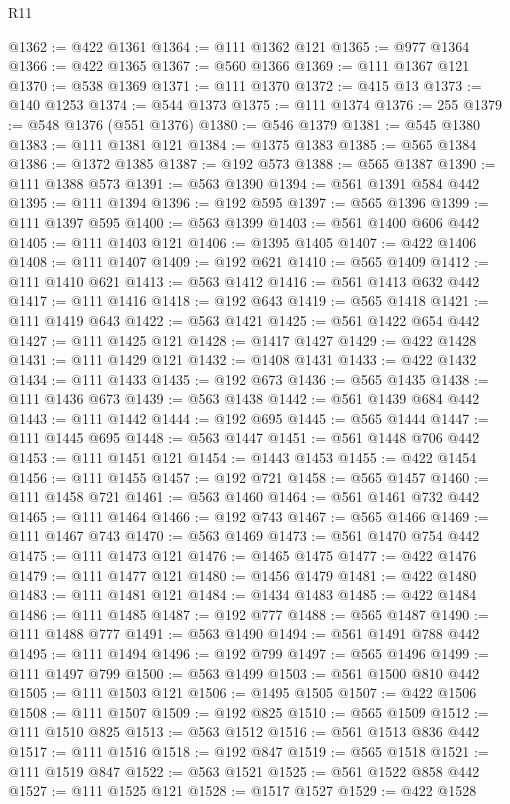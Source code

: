 \begin{lexlean}{R11}
\begin{coremodule}
{{{{{{{{{{{{{{{{{{{{{{{{{{{{{{{{{{{{{{{{{{{{{{{{{{{{{{{{{{{{{{{{{{{{{{{{{{{{{{{{{{@1362 := @422 @1361
@1364 := @111 @1362 @121
@1365 := @977 @1364
@1366 := @422 @1365
@1367 := @560 @1366
@1369 := @111 @1367 @121
@1370 := @538 @1369
@1371 := @111 @1370
@1372 := @415 @13
@1373 := @140 @1253
@1374 := @544 @1373
@1375 := @111 @1374
@1376 := 255
@1379 := @548 @1376 (@551 @1376)
@1380 := @546 @1379
@1381 := @545 @1380
@1383 := @111 @1381 @121
@1384 := @1375 @1383
@1385 := @565 @1384
@1386 := @1372 @1385
@1387 := @192 @573
@1388 := @565 @1387
@1390 := @111 @1388 @573
@1391 := @563 @1390
@1394 := @561 @1391 @584 @442
@1395 := @111 @1394
@1396 := @192 @595
@1397 := @565 @1396
@1399 := @111 @1397 @595
@1400 := @563 @1399
@1403 := @561 @1400 @606 @442
@1405 := @111 @1403 @121
@1406 := @1395 @1405
@1407 := @422 @1406
@1408 := @111 @1407
@1409 := @192 @621
@1410 := @565 @1409
@1412 := @111 @1410 @621
@1413 := @563 @1412
@1416 := @561 @1413 @632 @442
@1417 := @111 @1416
@1418 := @192 @643
@1419 := @565 @1418
@1421 := @111 @1419 @643
@1422 := @563 @1421
@1425 := @561 @1422 @654 @442
@1427 := @111 @1425 @121
@1428 := @1417 @1427
@1429 := @422 @1428
@1431 := @111 @1429 @121
@1432 := @1408 @1431
@1433 := @422 @1432
@1434 := @111 @1433
@1435 := @192 @673
@1436 := @565 @1435
@1438 := @111 @1436 @673
@1439 := @563 @1438
@1442 := @561 @1439 @684 @442
@1443 := @111 @1442
@1444 := @192 @695
@1445 := @565 @1444
@1447 := @111 @1445 @695
@1448 := @563 @1447
@1451 := @561 @1448 @706 @442
@1453 := @111 @1451 @121
@1454 := @1443 @1453
@1455 := @422 @1454
@1456 := @111 @1455
@1457 := @192 @721
@1458 := @565 @1457
@1460 := @111 @1458 @721
@1461 := @563 @1460
@1464 := @561 @1461 @732 @442
@1465 := @111 @1464
@1466 := @192 @743
@1467 := @565 @1466
@1469 := @111 @1467 @743
@1470 := @563 @1469
@1473 := @561 @1470 @754 @442
@1475 := @111 @1473 @121
@1476 := @1465 @1475
@1477 := @422 @1476
@1479 := @111 @1477 @121
@1480 := @1456 @1479
@1481 := @422 @1480
@1483 := @111 @1481 @121
@1484 := @1434 @1483
@1485 := @422 @1484
@1486 := @111 @1485
@1487 := @192 @777
@1488 := @565 @1487
@1490 := @111 @1488 @777
@1491 := @563 @1490
@1494 := @561 @1491 @788 @442
@1495 := @111 @1494
@1496 := @192 @799
@1497 := @565 @1496
@1499 := @111 @1497 @799
@1500 := @563 @1499
@1503 := @561 @1500 @810 @442
@1505 := @111 @1503 @121
@1506 := @1495 @1505
@1507 := @422 @1506
@1508 := @111 @1507
@1509 := @192 @825
@1510 := @565 @1509
@1512 := @111 @1510 @825
@1513 := @563 @1512
@1516 := @561 @1513 @836 @442
@1517 := @111 @1516
@1518 := @192 @847
@1519 := @565 @1518
@1521 := @111 @1519 @847
@1522 := @563 @1521
@1525 := @561 @1522 @858 @442
@1527 := @111 @1525 @121
@1528 := @1517 @1527
@1529 := @422 @1528
}}}}}}}}}}}}}}}}}}}}}}}}}}}}}}}}}}}}}}}}}}}}}}}}}}}}}}}}}}}}}}}}}}}}}}}}}}}}}}}}}}
\end{coremodule}
\end{lexlean}
